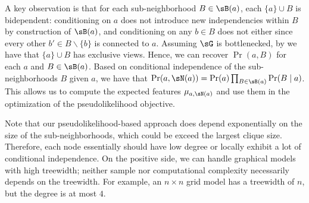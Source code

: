 A key observation is that for each sub-neighborhood $B \in \sB(a)$, each $\{a\} \cup B$ is bidependent:
conditioning on $a$ does not introduce new independencies within $B$ by construction of $\sB(a)$,
and conditioning on any $b \in B$ does not either since every other $b' \in B \backslash \{b\}$
is connected to $a$.
Assuming $\sG$ is bottlenecked, by 
we have that $\{a\} \cup B$ has exclusive views.
Hence, we can recover $\Pr(a,B)$ for each $a$ and $B \in \sB(a)$.
Based on conditional independence of the sub-neighborhoods $B$ given $a$,
we have that $\Pr(a, \sN(a)) = \Pr(a) \prod_{B \in \sB(a)} \Pr(B \mid a)$.
This allows us to compute the expected features $\mu_{a,\sN(a)}$ and use them
in the optimization of the pseudolikelihood objective.


Note that our pseudolikelihood-based approach
does depend exponentially on the size of the sub-neighborhoods,
which could be exceed the largest clique size.
Therefore,
each node essentially should have low degree or locally exhibit a lot of
conditional independence.
On the positive side, we can handle graphical models with high treewidth;
neither sample nor computational complexity necessarily depends on the treewidth.
For example, an $n\times n$ grid model has a treewidth of $n$, but the degree is at most $4$.
